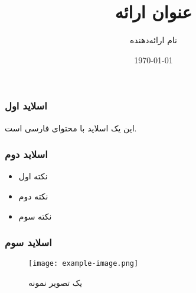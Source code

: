 \documentclass{beamer}
\title{عنوان ارائه}
\author{نام ارائه‌دهنده}
\date{\today}
\begin{document}
\begin{frame}
    \maketitle
\end{frame}

\begin{frame}
    \frametitle{اسلاید اول}
    این یک اسلاید با محتوای فارسی است.
\end{frame}

\begin{frame}
    \frametitle{اسلاید دوم}
    \begin{itemize}
        \item نکته اول
        \item نکته دوم
        \item نکته سوم
    \end{itemize}
\end{frame}

\begin{frame}
    \frametitle{اسلاید سوم}
    \begin{figure}
        \centering
        \texttt{[image: example-image.png]}
        \caption{یک تصویر نمونه}
    \end{figure}
\end{frame}
\end{document}

